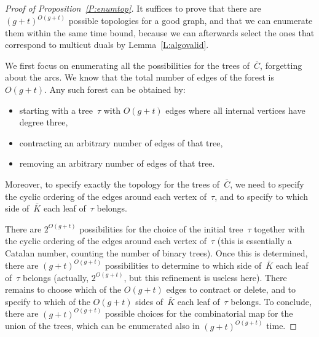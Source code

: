 \documentclass[11pt]{article}
\newcommand{\CC}{\ensuremath{\bar{C}}}
\newcommand{\KK}{\ensuremath{\bar{K}}}
\theoremstyle{plain}  \newtheorem{theorem}{Theorem}[section]
\theoremstyle{definition}
\begin{document}
\begin{proof}[Proof of Proposition~\ref{P:enumtop}]
  It suffices to prove that there are ${(g+t)}^{O(g+t)}$ possible
  topologies for a good graph, and that we can enumerate them within the
  same time bound, because we can afterwards select the ones that
  correspond to multicut duals by Lemma~\ref{L:algovalid}.

  We first focus on enumerating all the possibilities for the trees
  of~$\CC$, forgetting about the arcs.  We know that the total number of
  edges of the forest is $O(g+t)$.  Any such forest can be obtained by:
  \begin{itemize}
  \item starting with a tree~$\tau$ with $O(g+t)$ edges where all internal
    vertices have degree three,
  \item contracting an arbitrary number of edges of that tree,
  \item removing an arbitrary number of edges of that tree.
  \end{itemize}
  Moreover, to specify exactly the topology for the trees of~$\CC$, we need
  to specify the cyclic ordering of the edges around each vertex of~$\tau$,
  and to specify to which side of~$\KK$ each leaf of~$\tau$ belongs.

  There are $2^{O(g+t)}$ possibilities for the choice of the initial
  tree~$\tau$ together with the cyclic ordering of the edges around each
  vertex of~$\tau$ (this is essentially a Catalan number, counting the
  number of binary trees).  Once this is determined, there are
  $(g+t)^{O(g+t)}$ possibilities to determine to which side of~$\KK$ each
  leaf of~$\tau$ belongs (actually, $2^{O(g+t)}$, but this refinement is
  useless here).  There remains to choose which of the $O(g+t)$ edges to
  contract or delete, and to specify to which of the $O(g+t)$ sides
  of~$\KK$ each leaf of~$\tau$ belongs.  To conclude, there are
  $(g+t)^{O(g+t)}$ possible choices for the combinatorial map for the union
  of the trees, which can be enumerated also in $(g+t)^{O(g+t)}$ time.


\end{proof}
\end{document}
